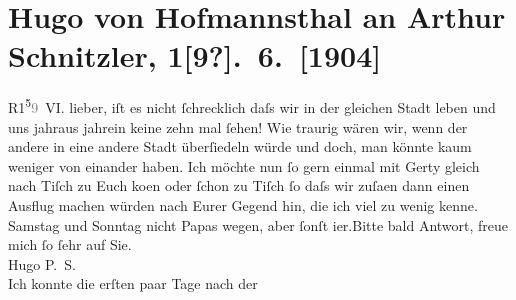 

         \renewcommand{\erwaehnteWerke}{}
               \section[Hugo von Hofmannsthal an Arthur Schnitzler, 1{[}9?{]}. 6. {[}1904{]}]{ Hugo von Hofmannsthal an Arthur Schnitzler, 1{[}9?{]}. 6. {[}1904{]}}\nopagebreak{}\rehead{ }\begin{ledgroupsized}[t]{13cm}\normalsize\beginnumbering \toendnotes[C]{\smallbreak\pagebreak[2]} 
\toendnotes[C]{\smallbreak}\pstart
           \raggedleft{}R1\substVorne{}\textsuperscript{5}\substDazwischen{}\textcolor{gray}{9}\substHinten{} VI.\pend
           \pstart
           {\pb}lieber, iſt es nicht ſchrecklich daſs wir in der gleichen Stadt
               leben und uns jahraus jahrein keine zehn mal ſehen!\pend
           \pstart
           Wie traurig wären wir, wenn der andere in eine andere Stadt überſiedeln würde und
               doch, man könnte kaum weniger von einander haben.\pend
           \pstart
           Ich möchte nun ſo gern einmal {\pb}mit
                  Gerty gleich nach Tiſch zu Euch ko{\geminationm}en oder ſchon zu Tiſch ſo daſs wir zuſa{\geminationm}en dann einen Ausflug machen würden nach Eurer Gegend
               hin, die ich viel zu wenig kenne.\pend
           \pstart
           Samstag und Sonntag nicht Papas wegen, aber ſonſt i{\geminationm}er.\hspace*{1.5em}Bitte bald Antwort, freue mich ſo ſehr auf Sie.{\\}\spacefill\mbox{Hugo}\pend
           \pstart
           \noindent{}\textsc{P. S.}{\\}Ich konnte die erſten paar Tage nach der \label{K_L01406_1v}
\end{ledgroupsized}
